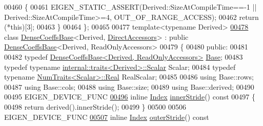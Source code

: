 \begin{DoxyCode}
00460     \{
00461       EIGEN\_STATIC\_ASSERT(Derived::SizeAtCompileTime==-1 || Derived::SizeAtCompileTime>=4, 
      OUT\_OF\_RANGE\_ACCESS);
00462       \textcolor{keywordflow}{return} (*\textcolor{keyword}{this})[3];
00463     \}
00464 \};
00465 
00477 \textcolor{keyword}{template}<\textcolor{keyword}{typename} Derived>
\hyperlink{group___core___module}{00478} \textcolor{keyword}{class }\hyperlink{class_eigen_1_1_dense_coeffs_base}{DenseCoeffsBase}<Derived, \hyperlink{group__enums_gga9f93eac38eb83deb0e8dbd42ddf11d5da47996b52dd3a8c298a8821675a557c55}{DirectAccessors}> : \textcolor{keyword}{public} 
      \hyperlink{class_eigen_1_1_dense_coeffs_base}{DenseCoeffsBase}<Derived, ReadOnlyAccessors>
00479 \{
00480   \textcolor{keyword}{public}:
00481 
00482     \textcolor{keyword}{typedef} \hyperlink{group___core___module_class_eigen_1_1_dense_coeffs_base_3_01_derived_00_01_read_only_accessors_01_4}{DenseCoeffsBase<Derived, ReadOnlyAccessors>} 
      \hyperlink{group___core___module_class_eigen_1_1_dense_coeffs_base_3_01_derived_00_01_read_only_accessors_01_4}{Base};
00483     \textcolor{keyword}{typedef} \textcolor{keyword}{typename} \hyperlink{struct_eigen_1_1internal_1_1traits}{internal::traits<Derived>::Scalar} Scalar;
00484     \textcolor{keyword}{typedef} \textcolor{keyword}{typename} \hyperlink{group___core___module_struct_eigen_1_1_num_traits}{NumTraits<Scalar>::Real} RealScalar;
00485 
00486     \textcolor{keyword}{using} Base::rows;
00487     \textcolor{keyword}{using} Base::cols;
00488     \textcolor{keyword}{using} Base::size;
00489     \textcolor{keyword}{using} Base::derived;
00490 
00495     EIGEN\_DEVICE\_FUNC
\hyperlink{group___core___module_a4f877f649686a935771dceaf3569b1fc}{00496}     \textcolor{keyword}{inline} \hyperlink{group___core___module_a554f30542cc2316add4b1ea0a492ff02}{Index} \hyperlink{group___core___module_a4f877f649686a935771dceaf3569b1fc}{innerStride}()\textcolor{keyword}{ const}
00497 \textcolor{keyword}{    }\{
00498       \textcolor{keywordflow}{return} derived().innerStride();
00499     \}
00500 
00506     EIGEN\_DEVICE\_FUNC
\hyperlink{group___core___module_aa5b9d836576cb6fa037d32a7414b1110}{00507}     \textcolor{keyword}{inline} \hyperlink{group___core___module_a554f30542cc2316add4b1ea0a492ff02}{Index} \hyperlink{group___core___module_aa5b9d836576cb6fa037d32a7414b1110}{outerStride}()\textcolor{keyword}{ const}

\end{DoxyCode}
